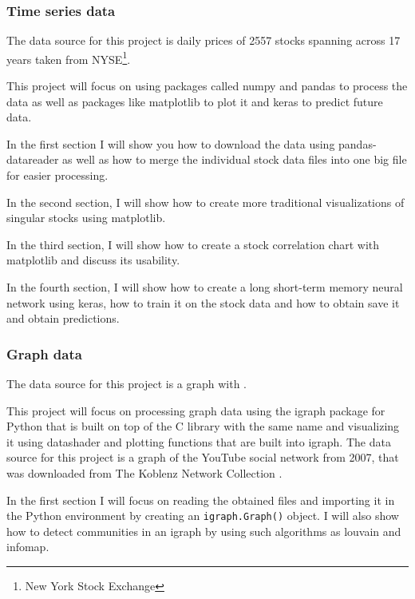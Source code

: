 \documentclass[12pt, a4paper]{article}
\begin{document}
\subsubsection{Time series data}

The data source for this project is daily prices of 2557 stocks spanning across 17 years taken from NYSE\footnote{New York Stock Exchange}.

This project will focus on using packages called numpy\cite{walt2011numpy} and pandas\cite{mckinney2010data_pandas} to process the data as well as packages like matplotlib\cite{hunter2007matplotlib} to plot it and keras\cite{chollet2015keras} to predict future data.

In the first section I will show you how to download the data using pandas-datareader as well as how to merge the individual stock data files into one big file for easier processing.

In the second section, I will show how to create more traditional visualizations of singular stocks using matplotlib.

In the third section, I will show how to create a stock correlation chart with matplotlib and discuss its usability.

In the fourth section, I will show how to create a long short-term memory neural network using keras, how to train it on the stock data and how to  obtain save it and obtain predictions.

\subsubsection{Graph data}

The data source for this project is a graph with .

This project will focus on processing graph data using the igraph package for Python that is built on top of the C library with the same name \cite{csardi2006igraph} and visualizing it using datashader \cite{ref_datashader} and plotting functions that are built into igraph. The data source for this project is a graph of the YouTube social network from 2007, that was downloaded from The Koblenz Network Collection \cite{youtube_source}.

In the first section I will focus on reading the obtained files and importing it in the Python environment by creating an \texttt{igraph.Graph()} object. I will also show how to detect communities in an igraph by using such algorithms as louvain\cite{blondel2011louvain} and infomap\cite{rosvall2008maps_infomap}.
\end{document}
